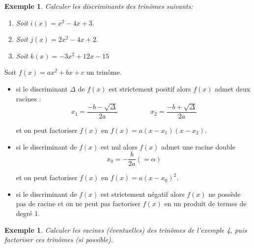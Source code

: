 \documentclass[a4paper,11pt]{article}
\theoremstyle{break}
\newcounter{enonce}
\newtheorem{exemple}[enonce]{Exemple}
\begin{document}
  \begin{exemple}
    
    Calculer les discriminants des trinômes suivants:
    \begin{enumerate}
     \item Soit $i(x)=x^2-4x+3$.
     \item Soit $j(x)=2x^2-4x+2$.
     \item Soit $k(x)=-3x^2+12x-15$
    \end{enumerate}
   \end{exemple}
  
  \begin{theorem}[Central]
    Soit $f(x)=ax^2+bx+c$ un trinôme.
    \begin{itemize}
     \item  si le discriminant $\Delta$ de $f(x)$ est strictement positif alors
     $f(x)$ admet deux racines :
     $$x_1=\frac{-b-\sqrt{\Delta}}{2a} \hspace{2cm} x_2=\frac{-b+\sqrt{\Delta}}{2a}$$
     
     et on peut factoriser $f(x)$ en $f(x)=a(x-x_1)(x-x_2)$.
     
     \item si le discriminant de $f(x)$ est nul alors $f(x)$ admet une racine double
     $$x_0=-\frac{b}{2a}(=\alpha)$$
     
     et on peut factoriser $f(x)$ en $f(x)=a(x-x_0)^2$.
     
     \item si le discriminant de $f(x)$ est strictement négatif alors
     $f(x)$ ne possède pas de racine et on ne peut pas factoriser $f(x)$ en un produit de termes de degré 1.
    \end{itemize}    
  \end{theorem}
  
  \begin{exemple}
    Calculer les racines (éventuelles) des trinômes de l'exemple 4, puis factoriser
    ces trinômes (si possible).
   \end{exemple}
  
  \newpage
  
\end{document}
